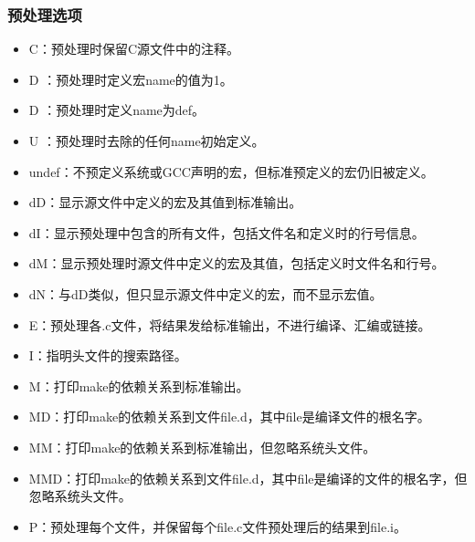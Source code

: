\documentclass[a4paper,12pt,english]{sphinxmanual}
\begin{document}
\subsubsection{预处理选项}
\label{\detokenize{compiler/gnu:id9}}\label{\detokenize{compiler/gnu:id10}}\begin{itemize}
\item {} 
\sphinxAtStartPar
\sphinxhyphen{}C：预处理时保留C源文件中的注释。

\item {} 
\sphinxAtStartPar
\sphinxhyphen{}D ：预处理时定义宏name的值为1。

\item {} 
\sphinxAtStartPar
\sphinxhyphen{}D ：预处理时定义name为def。

\item {} 
\sphinxAtStartPar
\sphinxhyphen{}U ：预处理时去除的任何name初始定义。

\item {} 
\sphinxAtStartPar
\sphinxhyphen{}undef：不预定义系统或GCC声明的宏，但标准预定义的宏仍旧被定义。

\item {} 
\sphinxAtStartPar
\sphinxhyphen{}dD：显示源文件中定义的宏及其值到标准输出。

\item {} 
\sphinxAtStartPar
\sphinxhyphen{}dI：显示预处理中包含的所有文件，包括文件名和定义时的行号信息。

\item {} 
\sphinxAtStartPar
\sphinxhyphen{}dM：显示预处理时源文件中定义的宏及其值，包括定义时文件名和行号。

\item {} 
\sphinxAtStartPar
\sphinxhyphen{}dN：与\sphinxhyphen{}dD类似，但只显示源文件中定义的宏，而不显示宏值。

\item {} 
\sphinxAtStartPar
\sphinxhyphen{}E：预处理各.c文件，将结果发给标准输出，不进行编译、汇编或链接。

\item {} 
\sphinxAtStartPar
\sphinxhyphen{}I：指明头文件的搜索路径。

\item {} 
\sphinxAtStartPar
\sphinxhyphen{}M：打印make的依赖关系到标准输出。

\item {} 
\sphinxAtStartPar
\sphinxhyphen{}MD：打印make的依赖关系到文件file.d，其中file是编译文件的根名字。

\item {} 
\sphinxAtStartPar
\sphinxhyphen{}MM：打印make的依赖关系到标准输出，但忽略系统头文件。

\item {} 
\sphinxAtStartPar
\sphinxhyphen{}MMD：打印make的依赖关系到文件file.d，其中file是编译的文件的根名字，但忽略系统头文件。

\item {} 
\sphinxAtStartPar
\sphinxhyphen{}P：预处理每个文件，并保留每个file.c文件预处理后的结果到file.i。

\end{itemize}
\end{document}
